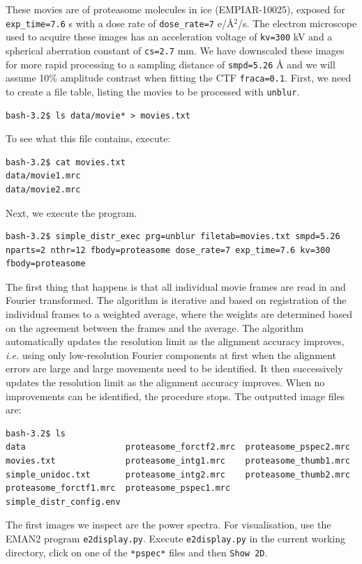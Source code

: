 \documentclass[a4paper,11pt]{article}
\newcommand{\prgname}[1]{\textcolor{NavyBlue}{\texttt{#1}}}
\begin{document}
These movies are of proteasome molecules in ice (EMPIAR-10025), exposed for \texttt{exp\_time=7.6} s with a dose rate of \texttt{dose\_rate=7} e/\AA{}$^2$/s. The  electron microscope used to acquire these images has an acceleration voltage of \texttt{kv=300} kV and a spherical aberration constant of \texttt{cs=2.7} mm. We have downscaled these images for more rapid processing to a sampling distance of \texttt{smpd=5.26} \AA{} and we will assume 10\% amplitude contrast when fitting the CTF \texttt{fraca=0.1}. First, we need to create a file table, listing the movies to be processed with  \prgname{unblur}.
\begin{verbatim}
bash-3.2$ ls data/movie* > movies.txt
\end{verbatim}
To see what this file contains, execute:
\begin{verbatim}
bash-3.2$ cat movies.txt 
data/movie1.mrc
data/movie2.mrc
\end{verbatim}
Next, we execute the program.
\begin{verbatim}
bash-3.2$ simple_distr_exec prg=unblur filetab=movies.txt smpd=5.26 
nparts=2 nthr=12 fbody=proteasome dose_rate=7 exp_time=7.6 kv=300 
fbody=proteasome
\end{verbatim}
The first thing that happens is that all individual movie frames are read in and Fourier transformed. The algorithm is iterative and based on registration of the individual frames to a weighted average, where the weights are determined based on the agreement between the frames and the average. The algorithm automatically updates the resolution limit as the alignment accuracy improves, \textit{i.e.} using only low-resolution Fourier components at first when the alignment errors are large and large movements need to be identified. It then successively updates the resolution limit as the alignment accuracy improves. When no improvements can be identified, the procedure stops. The outputted image files are:
\begin{verbatim}
bash-3.2$ ls
data                    proteasome_forctf2.mrc  proteasome_pspec2.mrc    
movies.txt              proteasome_intg1.mrc    proteasome_thumb1.mrc
simple_unidoc.txt       proteasome_intg2.mrc    proteasome_thumb2.mrc
proteasome_forctf1.mrc  proteasome_pspec1.mrc   simple_distr_config.env
\end{verbatim}
The first images we inspect are the power spectra. For visualisation, use the EMAN2 program \texttt{e2display.py}. Execute \texttt{e2display.py} in the current working directory, click on one of the \texttt{*pspec*} files and then \texttt{Show 2D}.
\end{document}
